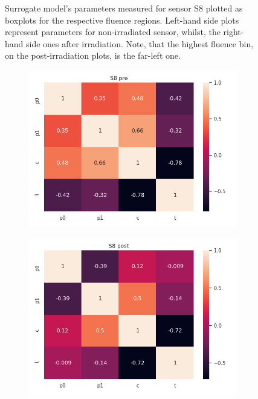 \begin{figure}[H]
\begin{subfigure}[b]{0.95\textwidth}
  \end{subfigure}
  \caption[Parameters in s8 bins]{Surrogate model's parameters measured for sensor S8 plotted as boxplots for the respective fluence regions. Left-hand side plots represent parameters for non-irradiated sensor, whilst, the right-hand side ones after irradiation. Note, that the highest fluence bin, on the post-irradiation plots, is the far-left one.}
    \label{plot:surr_s8_bins}
\end{figure}

\begin{figure}[H]
    \centering
\begin{subfigure}[b]{0.45\textwidth}
    \centering
    \includegraphics[width=\linewidth]{figures/chapter4/surrogates/p1_S8_corr_pre.png}
  \end{subfigure}
\begin{subfigure}[b]{0.45\textwidth}
    \centering
    \includegraphics[width=\linewidth]{figures/chapter4/surrogates/p1_S8_corr_post.png}

\end{subfigure}
\end{figure}
